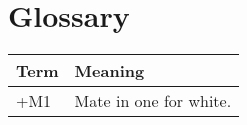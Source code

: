 \newpage



\section{Glossary}

\begin{table}[H]
  \centering
  \begin{tabular}{p{.1\linewidth} | p{.8\linewidth}}
    \textbf{Term} & \textbf{Meaning}       \\\hline
    +M1           & Mate in one for white.
  \end{tabular}
  \label{tab:glossary}
\end{table}